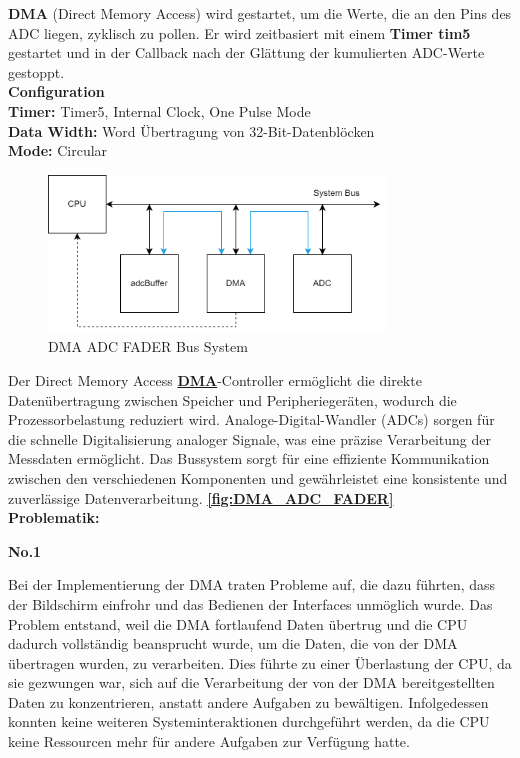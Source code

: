 \textbf{DMA} (Direct Memory Access) wird gestartet, um die Werte, die an den Pins des ADC liegen, zyklisch zu pollen. Er wird zeitbasiert mit einem \textbf{Timer tim5} gestartet und in der Callback nach der Glättung der kumulierten ADC-Werte gestoppt. \\

\textbf{Configuration}\\

\textbf{Timer:} Timer5, Internal Clock, One Pulse Mode \\
\textbf{Data Width:} Word Übertragung von 32-Bit-Datenblöcken \\
\textbf{Mode:} Circular \\

\begin{figure}[H]
\centering
\includegraphics[width=0.8\textwidth]{images/08_durchfuehrung/interface/DMA_ADC_MEM.drawio.png}
\caption{DMA ADC FADER Bus System}
\label{fig:DMA_ADC_FADER}
\end{figure}

Der Direct Memory Access \textbf{\hyperlink{DMA}{DMA}}-Controller ermöglicht die direkte Datenübertragung zwischen Speicher und Peripheriegeräten, wodurch die Prozessorbelastung reduziert wird. Analoge-Digital-Wandler (ADCs) sorgen für die schnelle Digitalisierung analoger Signale, was eine präzise Verarbeitung der Messdaten ermöglicht. Das Bussystem sorgt für eine effiziente Kommunikation zwischen den verschiedenen Komponenten und gewährleistet eine konsistente und zuverlässige Datenverarbeitung. \textbf{\autoref{fig:DMA_ADC_FADER}}\cite{dma-adc-work} \\

\textbf{Problematik:}

\textbf{No.1}

Bei der Implementierung der DMA traten Probleme auf, die dazu führten, dass der Bildschirm einfrohr und das Bedienen der Interfaces unmöglich wurde. Das Problem entstand, weil die DMA fortlaufend Daten übertrug und die CPU dadurch vollständig beansprucht wurde, um die Daten, die von der DMA übertragen wurden, zu verarbeiten. Dies führte zu einer Überlastung der CPU, da sie gezwungen war, sich auf die Verarbeitung der von der DMA bereitgestellten Daten zu konzentrieren, anstatt andere Aufgaben zu bewältigen. Infolgedessen konnten keine weiteren Systeminteraktionen durchgeführt werden, da die CPU keine Ressourcen mehr für andere Aufgaben zur Verfügung hatte.

